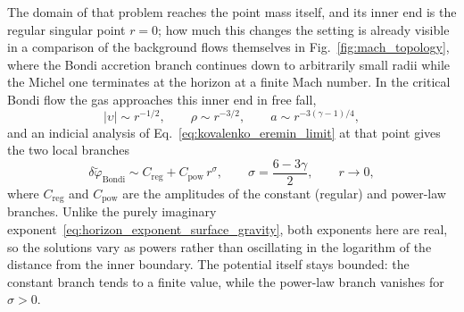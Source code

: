 \documentclass[12pt,a4paper,preprint,nopreprintline]{elsarticle}
\begin{document}
The domain of that problem reaches the point mass itself, and its inner end is the regular singular point $r=0$; how much this changes the setting is already visible in a comparison of the background flows themselves in Fig.~\ref{fig:mach_topology}, where the Bondi accretion branch continues down to arbitrarily small radii while the Michel one terminates at the horizon at a finite Mach number. In the critical Bondi flow the gas approaches this inner end in free fall,
\begin{equation}
    |\upsilon|\sim r^{-1/2},
    \qquad
    \rho\sim r^{-3/2},
    \qquad
    a\sim r^{-3(\gamma-1)/4},
    \label{eq:bondi_freefall_asymptotics}
\end{equation}
and an indicial analysis of Eq.~\eqref{eq:kovalenko_eremin_limit} at that point gives the two local branches~\cite{KovalenkoIG_EreminMA_SpatialInstabilityOfSphericalAccretion_1998}
\begin{equation}
    \delta\widetilde{\varphi}_{\mathrm{Bondi}}
    \sim
    C_{\mathrm{reg}}+C_{\mathrm{pow}}\,r^{\sigma},
    \qquad
    \sigma=\frac{6-3\gamma}{2},
    \qquad
    r\rightarrow0,
    \label{eq:bondi_local_branches}
\end{equation}
where $C_{\mathrm{reg}}$ and $C_{\mathrm{pow}}$ are the amplitudes of the constant (regular) and power-law branches. Unlike the purely imaginary exponent~\eqref{eq:horizon_exponent_surface_gravity}, both exponents here are real, so the solutions vary as powers rather than oscillating in the logarithm of the distance from the inner boundary. The potential itself stays bounded: the constant branch tends to a finite value, while the power-law branch vanishes for $\sigma>0$.
\end{document}
